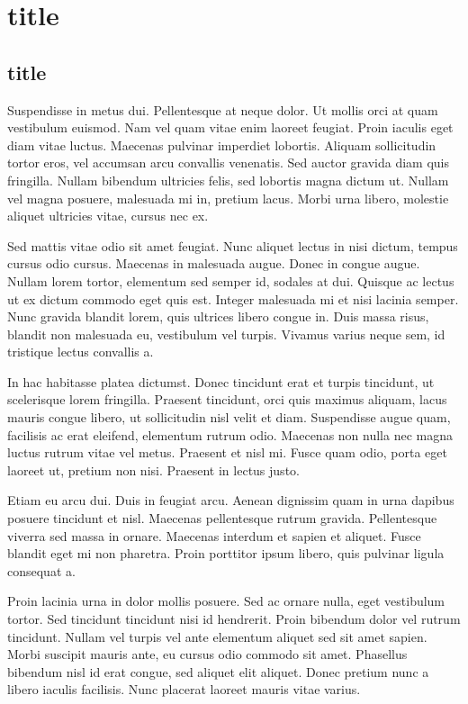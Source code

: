 \documentclass{report}
\begin{document}
	\clearpage
	
	\section{title}
	\subsection{title}
	
	Suspendisse in metus dui. Pellentesque at neque dolor. Ut mollis orci at quam vestibulum euismod. Nam vel quam vitae enim laoreet feugiat. Proin iaculis eget diam vitae luctus. Maecenas pulvinar imperdiet lobortis. Aliquam sollicitudin tortor eros, vel accumsan arcu convallis venenatis. Sed auctor gravida diam quis fringilla. Nullam bibendum ultricies felis, sed lobortis magna dictum ut. Nullam vel magna posuere, malesuada mi in, pretium lacus. Morbi urna libero, molestie aliquet ultricies vitae, cursus nec ex.
	
	Sed mattis vitae odio sit amet feugiat. Nunc aliquet lectus in nisi dictum, tempus cursus odio cursus. Maecenas in malesuada augue. Donec in congue augue. Nullam lorem tortor, elementum sed semper id, sodales at dui. Quisque ac lectus ut ex dictum commodo eget quis est. Integer malesuada mi et nisi lacinia semper. Nunc gravida blandit lorem, quis ultrices libero congue in. Duis massa risus, blandit non malesuada eu, vestibulum vel turpis. Vivamus varius neque sem, id tristique lectus convallis a.
	
	In hac habitasse platea dictumst. Donec tincidunt erat et turpis tincidunt, ut scelerisque lorem fringilla. Praesent tincidunt, orci quis maximus aliquam, lacus mauris congue libero, ut sollicitudin nisl velit et diam. Suspendisse augue quam, facilisis ac erat eleifend, elementum rutrum odio. Maecenas non nulla nec magna luctus rutrum vitae vel metus. Praesent et nisl mi. Fusce quam odio, porta eget laoreet ut, pretium non nisi. Praesent in lectus justo.
	
	Etiam eu arcu dui. Duis in feugiat arcu. Aenean dignissim quam in urna dapibus posuere tincidunt et nisl. Maecenas pellentesque rutrum gravida. Pellentesque viverra sed massa in ornare. Maecenas interdum et sapien et aliquet. Fusce blandit eget mi non pharetra. Proin porttitor ipsum libero, quis pulvinar ligula consequat a.
	
	Proin lacinia urna in dolor mollis posuere. Sed ac ornare nulla, eget vestibulum tortor. Sed tincidunt tincidunt nisi id hendrerit. Proin bibendum dolor vel rutrum tincidunt. Nullam vel turpis vel ante elementum aliquet sed sit amet sapien. Morbi suscipit mauris ante, eu cursus odio commodo sit amet. Phasellus bibendum nisl id erat congue, sed aliquet elit aliquet. Donec pretium nunc a libero iaculis facilisis. Nunc placerat laoreet mauris vitae varius.
	
\end{document}
